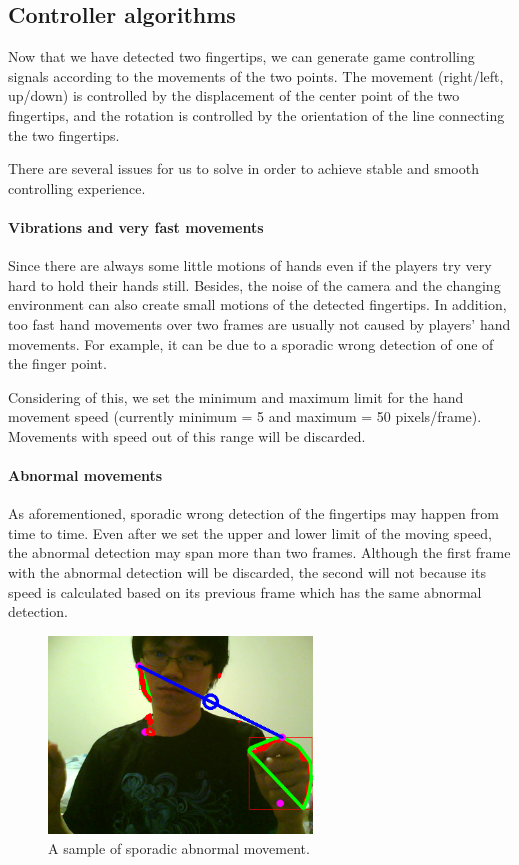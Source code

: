 \documentclass[10pt,twocolumn,letterpaper]{article}
\begin{document}
\subsection{Controller algorithms}
\label{sec:controller}
Now that we have detected two fingertips, we can generate game 
controlling signals according to the movements of the two points. 
The movement (right/left, up/down) is controlled by the 
displacement of the center point of the two fingertips, and 
the rotation is controlled by the orientation of the line connecting 
the two fingertips. 

There are several issues for us to solve in order to achieve stable and smooth controlling experience.

\paragraph{Vibrations and very fast movements} 
Since there are always some little motions of hands even if the players try very hard 
to hold their hands still. Besides, the noise of the camera and the changing environment 
can also create small motions of the detected fingertips. In addition, too fast 
hand movements over two frames are usually not caused by players' hand movements. 
For example, it can be due to a sporadic wrong detection of one of the finger point. 

Considering of this, we set the minimum and maximum limit for the hand movement 
speed (currently minimum = 5 and maximum = 50 pixels/frame). Movements with speed 
out of this range will be discarded.

\paragraph{Abnormal movements}
As aforementioned, sporadic wrong detection of the fingertips may happen from time 
to time. Even after we set the upper and lower limit of the moving speed, the 
abnormal detection may span more than two frames. Although the first frame with 
the abnormal detection will be discarded, the second will not because its speed 
is calculated based on its 
previous frame which has the same abnormal detection.

\begin{figure}[h]
\centering
\includegraphics[width=7cm]{abnormal.png}
\caption{A sample of sporadic abnormal movement.}
\label{fig:abnormal}
\end{figure}
\end{document}
